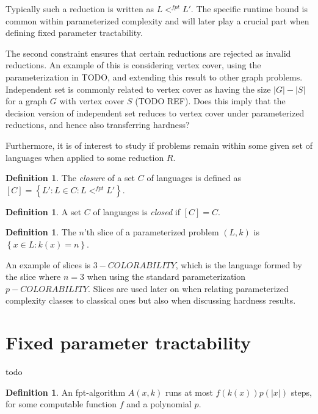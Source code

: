 \documentclass[a4paper,11pt,notitlepage]{report}
\theoremstyle{plain}
\theoremstyle{definition}
\newtheorem{defn}[thm]{Definition} %
\begin{document}
Typically such a reduction is written as $L <^{fpt} L'$.
The specific runtime bound is common within parameterized complexity and will later play a crucial part when defining fixed parameter tractability.

The second constraint ensures that certain reductions are rejected as invalid reductions.
An example of this is considering vertex cover, using the parameterization in TODO, and extending this result to other graph problems.
Independent set is commonly related to vertex cover as having the size $|G| - |S|$ for a graph $G$ with vertex cover $S$ (TODO REF).
Does this imply that the decision version of independent set reduces to vertex cover under parameterized reductions, and hence also transferring hardness?

Furthermore, it is of interest to study if problems remain within some given set of languages when applied to some reduction $R$.

\begin{defn}
The \emph{closure} of a set $C$ of languages is defined as $\left[ C \right] = \left\{ L' : L \in C : L <^{fpt} L'\right\}$.
\end{defn}

\begin{defn}
A set $C$ of languages is \emph{closed} if $\left[ C \right] = C$.
\end{defn}

\begin{defn}
The $n$'th slice of a parameterized problem $(L, k)$ is $\left\{ x \in L : k(x) = n \right\}$.
\end{defn}

An example of slices is $3-COLORABILITY$, which is the language formed by the slice where $n = 3$ when using the standard parameterization $p-COLORABILITY$.
Slices are used later on when relating parameterized complexity classes to classical ones but also when discussing hardness results.

\section{Fixed parameter tractability}
todo

\begin{defn}
An fpt-algorithm $A(x, k)$ runs at most $f(k(x)) p(|x|)$ steps, for some computable function $f$ and a polynomial $p$.
\end{defn}
\end{document}
